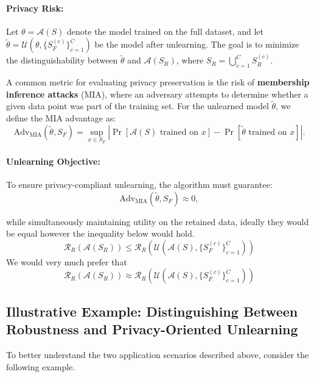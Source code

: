 \documentclass{article}
\begin{document}
\paragraph{Privacy Risk:}
Let $\theta = \mathcal{A}(S)$ denote the model trained on the full dataset, and let $\tilde{\theta} = \mathcal{U}(\theta, \{S_F^{(c)}\}_{c=1}^C)$ be the model after unlearning. The goal is to minimize the distinguishability between $\tilde{\theta}$ and $\mathcal{A}(S_R)$, where $S_R = \bigcup_{c=1}^{C} S_R^{(c)}$.

A common metric for evaluating privacy preservation is the risk of \textbf{membership inference attacks} (MIA), where an adversary attempts to determine whether a given data point was part of the training set. For the unlearned model $\tilde{\theta}$, we define the MIA advantage as:
\[
\text{Adv}_{\text{MIA}}(\tilde{\theta}, S_F) = \sup_{x \in S_F} \left| \Pr[\mathcal{A}(S) \text{ trained on } x] - \Pr[\tilde{\theta} \text{ trained on } x] \right|.
\]

\paragraph{Unlearning Objective:} To ensure privacy-compliant unlearning, the algorithm must guarantee:
\begin{equation}
    \text{Adv}_{\text{MIA}}(\tilde{\theta}, S_F) \approx 0,
\end{equation}

while simultaneously maintaining utility on the retained data, ideally they would be equal however the inequality below would hold.
\begin{equation}
 \mathcal{R}_R\left(\mathcal{A}(S_R)\right)  \leq \mathcal{R}_R\left(\mathcal{U}\left(\mathcal{A}(S), \{S_F^{(c)}\}_{c=1}^C\right)\right)
\end{equation}
We would very much prefer that
\begin{equation}
 \mathcal{R}_R\left(\mathcal{A}(S_R)\right)  \approx \mathcal{R}_R\left(\mathcal{U}\left(\mathcal{A}(S), \{S_F^{(c)}\}_{c=1}^C\right)\right)
\end{equation}


\subsection{Illustrative Example: Distinguishing Between Robustness and Privacy-Oriented Unlearning}

To better understand the two application scenarios described above, consider the following example.
\end{document}
